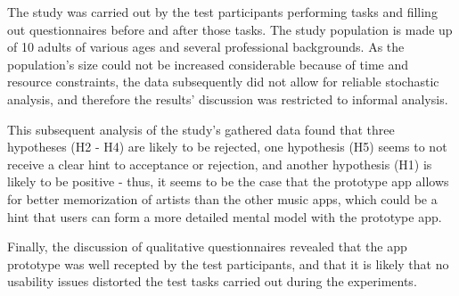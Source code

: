 The study was carried out by the test participants performing tasks and filling out questionnaires before and after those tasks. The study population is made up of 10 adults of various ages and several professional backgrounds. As the population's size could not be increased considerable because of time and resource constraints, the data subsequently did not allow for reliable stochastic analysis, and therefore the results' discussion was restricted to informal analysis.

This subsequent analysis of the study's gathered data found that three hypotheses (H2 - H4) are likely to be rejected, one hypothesis (H5) seems to not receive a clear hint to acceptance or rejection, and another hypothesis (H1) is likely to be positive - thus, it seems to be the case that the prototype app allows for better memorization of artists than the other music apps, which could be a hint that users can form a more detailed mental model with the prototype app.

Finally, the discussion of qualitative questionnaires revealed that the app prototype was well recepted by the test participants, and that it is likely that no usability issues distorted the test tasks carried out during the experiments.